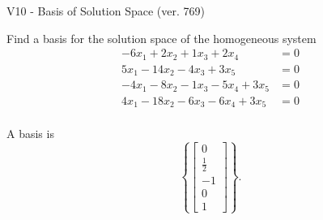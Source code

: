 \begin{exercise}
  \begin{exerciseTitle}V10 - Basis of Solution Space (ver. 769)\end{exerciseTitle}
  \begin{exerciseStatement}
    Find a basis for the solution space of the homogeneous system 
\begin{align*}
 -6 x_ 1 + 2 x_ 2 + 1 x_ 3 + 2 x_ 4 &= 0  \\ 
  5 x_ 1 -14 x_ 2 -4 x_ 3 + 3 x_ 5 &= 0  \\ 
  -4 x_ 1 -8 x_ 2 -1 x_ 3 -5 x_ 4 + 3 x_ 5 &= 0  \\ 
  4 x_ 1 -18 x_ 2 -6 x_ 3 -6 x_ 4 + 3 x_ 5 &= 0  \\ 
 \end{align*}


 
  \end{exerciseStatement}

  \begin{exerciseAnswer}
   A basis is   
\[\left\{\left[\begin{array}{c}
0 \\
\frac{1}{2} \\
-1 \\
0 \\
1
\end{array}\right]\right\}.\]

  


  \end{exerciseAnswer}
\end{exercise}